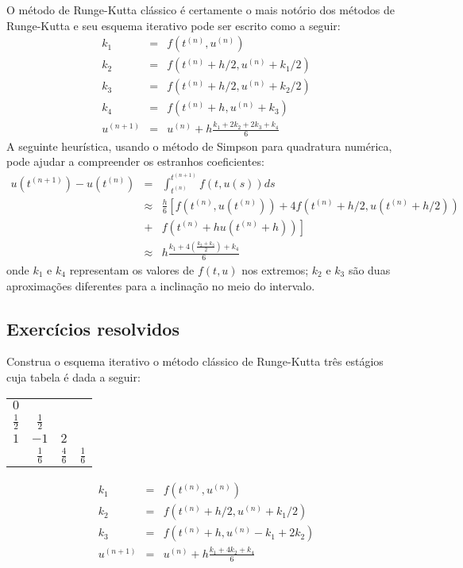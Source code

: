 O método de Runge-Kutta clássico é certamente o mais notório dos métodos de Runge-Kutta e seu esquema iterativo pode ser escrito como a seguir:
\begin{eqnarray*}
k_1&=&f\left(t^{(n)},u^{(n)}\right)\\
k_2&=&f\left(t^{(n)}+h/2,u^{(n)}+k_1/2\right)\\
k_3&=&f\left(t^{(n)}+h/2,u^{(n)}+k_2/2\right)\\
k_4&=&f\left(t^{(n)}+h,u^{(n)}+k_3\right)\\
u^{(n+1)}&=&u^{(n)}+h\frac{k_1+2k_2+2k_3+k_4}{6}
\end{eqnarray*}
A seguinte heurística, usando o método de Simpson para quadratura numérica, pode ajudar a compreender os estranhos coeficientes:
\begin{eqnarray*}
u({t^{(n+1)}})-u({t^{(n)}})&=&\int_{t^{(n)}}^{t^{(n+1)}}f(t,u(s))ds \\
&\approx& \frac{h}{6}\left[ f\left(t^{(n)},u(t^{(n)})\right)+4f\left(t^{(n)}+h/2,u(t^{(n)}+h/2)\right)\right.\\
&+&\left.f\left(t^{(n)}+hu(t^{(n)}+h)\right)\right]\\
&\approx& h\frac{k_1+4(\frac{k_2+k_3}{2})+k_4}{6}
\end{eqnarray*}
onde $k_1$ e $k_4$ representam os valores de $f(t,u)$ nos extremos; $k_2$ e $k_3$ são duas aproximações diferentes para a inclinação no meio do intervalo.

\subsection*{Exercícios resolvidos}
\begin{exeresol}\label{pvi:problema_resolvido_RK3} Construa o esquema iterativo o método clássico de Runge-Kutta três estágios cuja tabela é dada a seguir:

\begin{tabular}{c|ccc}
  $0$           &               &               & \\
  $\frac{1}{2}$ & $\frac{1}{2}$ &               & \\
  $1$           & $-1$          & $2$           & \\  \hline
                & $\frac{1}{6}$ & $\frac{4}{6}$ & $\frac{1}{6}$
\end{tabular}

\end{exeresol}
\begin{resol}
 \begin{eqnarray*}
    k_1&=&f\left(t^{(n)},u^{(n)}\right)\\
    k_2&=&f\left(t^{(n)}+h/2,u^{(n)}+k_1/2\right)\\
    k_3&=&f\left(t^{(n)}+h,u^{(n)}-k_1+2k_2\right)\\
  u^{(n+1)}&=&u^{(n)}+h\frac{k_1+4k_2+k_4}{6}
 \end{eqnarray*}
\end{resol}

